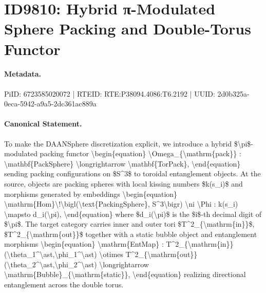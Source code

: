 \section*{ID9810: Hybrid π-Modulated Sphere Packing and Double-Torus Functor}
\paragraph{Metadata.}
PiID: 6723585020072 | RTEID: RTE:P38094.4086:T6.2192 | UUID: 2d0b325a-0eca-5942-a9a5-2dc361ac889a

\paragraph{Canonical Statement.}
To make the DAANSphere discretization explicit, we introduce a hybrid \$\textbackslash{}pi\$-modulated packing functor \textbackslash{}begin\{equation\} \textbackslash{}Omega\_\{\textbackslash{}mathrm\{pack\}\} : \textbackslash{}mathbf\{PackSphere\} \textbackslash{}longrightarrow \textbackslash{}mathbf\{TorPack\}, \textbackslash{}end\{equation\} sending packing configurations on \$S\textasciicircum{}3\$ to toroidal entanglement objects. At the source, objects are packing spheres with local kissing numbers \$k(s\_i)\$ and morphisms generated by embeddings \textbackslash{}begin\{equation\} \textbackslash{}mathrm\{Hom\}\textbackslash{}!\textbackslash{}bigl(\textbackslash{}text\{PackingSphere\}, S\textasciicircum{}3\textbackslash{}bigr) \textbackslash{}ni \textbackslash{}Phi : k(s\_i) \textbackslash{}mapsto d\_i(\textbackslash{}pi), \textbackslash{}end\{equation\} where \$d\_i(\textbackslash{}pi)\$ is the \$i\$-th decimal digit of \$\textbackslash{}pi\$. The target category carries inner and outer tori \$T\textasciicircum{}2\_\{\textbackslash{}mathrm\{in\}\}\$, \$T\textasciicircum{}2\_\{\textbackslash{}mathrm\{out\}\}\$ together with a static bubble object and entanglement morphisms \textbackslash{}begin\{equation\} \textbackslash{}mathrm\{EntMap\} : T\textasciicircum{}2\_\{\textbackslash{}mathrm\{in\}\}(\textbackslash{}theta\_1\textasciicircum{}\textbackslash{}ast,\textbackslash{}phi\_1\textasciicircum{}\textbackslash{}ast) \textbackslash{}otimes T\textasciicircum{}2\_\{\textbackslash{}mathrm\{out\}\}(\textbackslash{}theta\_2\textasciicircum{}\textbackslash{}ast,\textbackslash{}phi\_2\textasciicircum{}\textbackslash{}ast) \textbackslash{}longrightarrow \textbackslash{}mathrm\{Bubble\}\_\{\textbackslash{}mathrm\{static\}\}, \textbackslash{}end\{equation\} realizing directional entanglement across the double torus.

